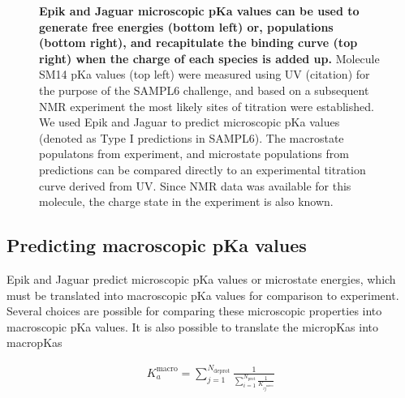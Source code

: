 \documentclass[9pt,lineno,final]{elife}
\begin{document}
\begin{figure}[H]
		\caption{{\bf Epik and Jaguar microscopic pKa values can be used to generate free energies (bottom left) or, populations (bottom right), and recapitulate the binding curve (top right) when the charge of each species is added up.} Molecule SM14 pKa values (top left) were measured using UV (citation) for the purpose of the SAMPL6 challenge, and based on a subsequent NMR experiment the most likely sites of titration were established. We used Epik and Jaguar to predict microscopic pKa values (denoted as Type I predictions in SAMPL6). The macrostate populatons from experiment, and microstate populations from predictions can be compared directly to an experimental titration curve derived from UV. Since NMR data was available for this molecule, the charge state in the experiment is also known.
	\label{fig:sm14-prediction}}
	
\end{figure}





\subsection{Predicting macroscopic pKa values}

Epik and Jaguar predict microscopic pKa values or microstate energies, which must be translated into macroscopic pKa values for comparison to experiment.
Several choices are possible for comparing these microscopic properties into macroscopic pKa values.
%
It is also possible to translate the micropKas into macropKas
\cite{Philipp2018macropka}

\begin{align}
 K_a^\text{macro} = \sum_{j=1}^{N_\text{deprot}} \frac{1}{\sum_{i=1}^{N_\text{prot}}\frac{1}{ K_{ij^\text{micro}}}} \label{eq:macropka}
 \end{align}

 
\end{document}
